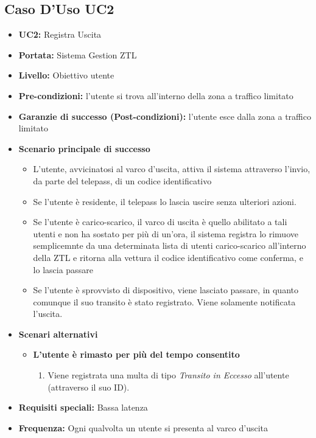 \documentclass[12pt, letterpaper]{article}
\begin{document}
\subsection{Caso D'Uso UC2}
\begin{itemize}
    \item \textbf{UC2:} Registra Uscita
    \item \textbf{Portata:} Sistema Gestion ZTL
    \item \textbf{Livello:} Obiettivo utente
    \item \textbf{Pre-condizioni:} l'utente si trova 
    all'interno della zona a traffico limitato
    \item \textbf{Garanzie di successo (Post-condizioni):} 
    l'utente esce dalla zona a traffico limitato
    \item \textbf{Scenario principale di successo}
    \begin{itemize}
        \item L'utente, avvicinatosi al varco d'uscita, 
        attiva il sistema attraverso l'invio, 
        da parte del telepass, di un codice identificativo
        \item Se l'utente è residente, il telepass lo 
        lascia uscire senza ulteriori azioni.
        \item Se l'utente è carico-scarico, il varco di uscita 
        è quello abilitato a tali utenti e non ha sostato per 
        più di un'ora, il sistema registra lo rimuove 
        semplicemnte da una determinata lista di utenti 
        carico-scarico all'interno della ZTL e ritorna alla 
        vettura il codice identificativo come conferma, e 
        lo lascia passare
        \item Se l'utente è sprovvisto di dispositivo,
        viene lasciato passare, in quanto comunque il 
        suo transito è stato registrato. Viene solamente
        notificata l'uscita.
    \end{itemize}    
    \item \textbf{Scenari alternativi}
    \begin{itemize}
        \item \textbf{L'utente è rimasto per più del 
        tempo consentito}
        \begin{enumerate}
            \item Viene registrata una multa di tipo 
            \emph{Transito in Eccesso} all'utente (attraverso
            il suo ID).
        \end{enumerate}
    \end{itemize}
    
    \item \textbf{Requisiti speciali:} Bassa latenza
    \item \textbf{Frequenza:} Ogni qualvolta un utente 
    si presenta al varco d'uscita 
\end{itemize}
\end{document}
